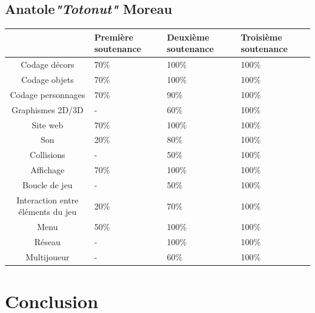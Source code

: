 \documentclass{article}
\begin{document}
\subsection {Anatole\textcolor {pseudoblue} {\textit {"Totonut"}} Moreau}
\newpage
\begin{tabular}{|c|p{2cm}|p{2cm}|p{2cm}|}


\hline
& Première soutenance & Deuxième soutenance & Troisième soutenance\\ 
\hline

Codage décors & 70\% & 100\% & 100\%\\
\hline
Codage objets & 70\% & 100\% & 100\%\\
\hline
Codage personnages & 70\% & 90\% & 100\%\\
\hline

Graphismes 2D/3D & - & 60\% & 100\%\\
\hline

Site web & 70\% & 100\% & 100\%\\
\hline

Son & 20\% & 80\% & 100\%\\
\hline

Collisions & - & 50\% & 100\%\\
\hline

Affichage & 70\% & 100\% & 100\%\\
\hline

Boucle de jeu & - & 50\% & 100\%\\
\hline

Interaction entre éléments du jeu & 20\% & 70\% & 100\%\\
\hline

Menu & 50\% & 100\% & 100\%\\
\hline

Réseau & - & 100\% & 100\%\\
\hline

Multijoueur & - & 60\% & 100\%\\
\hline

\end{tabular}

\section{Conclusion}
\end{document}

